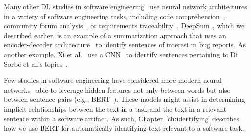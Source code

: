 Many other \acs{DL} studies in software engineering~\cite{ferreira2021,li2018deep, watson2022}
use neural network architectures 
in a variety of software engineering tasks, including
code comprehension~\cite{allamanis2015, mi2018}, community forum analysis~\cite{Lin2018, wang2019}, or requirements traceability~\cite{chen2019, guo2017}.
DeepSum~\cite{Li2018}, which we described earlier, is an example of a 
summarization approach that uses an encoder-decoder architecture~\cite{cho2014-encoder-decoder}  to identify 
sentences of interest in bug reports. As another example,
Xi et al.~\cite{Xia2017} use a \ac{CNN}~\cite{krizhevsky2012CNN} 
to identify sentences pertaining to Di Sorbo et al.'s topics~\cite{Sorbo2015}.



Few studies in software engineering have considered more modern neural networks~\cite{watson2022}
able to leverage hidden features not only between words but also between sentence pairs (e.g., \acs{BERT}~\cite{Devlin2018Bert}). 
These models might assist in determining 
implicit relationships between the text in a task and the text in a relevant sentence within a software artifact.
As such, Chapter~\ref{ch:identifying} describes how we use \acs{BERT} for automatically 
identifying text relevant to a software task.
